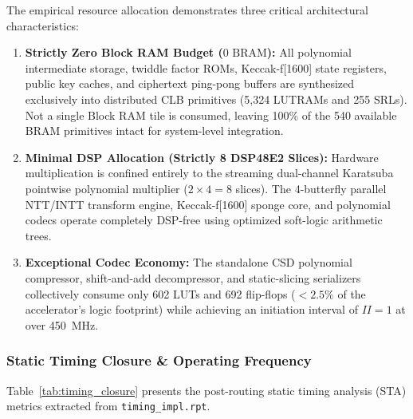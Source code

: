 The empirical resource allocation demonstrates three critical architectural characteristics:
\begin{enumerate}
    \item \textbf{Strictly Zero Block RAM Budget ($0\text{ BRAM}$):} All polynomial intermediate storage, twiddle factor ROMs, Keccak-f[1600] state registers, public key caches, and ciphertext ping-pong buffers are synthesized exclusively into distributed CLB primitives (5,324 LUTRAMs and 255 SRLs). Not a single Block RAM tile is consumed, leaving 100\% of the 540 available BRAM primitives intact for system-level integration.
    \item \textbf{Minimal DSP Allocation (Strictly 8 DSP48E2 Slices):} Hardware multiplication is confined entirely to the streaming dual-channel Karatsuba pointwise polynomial multiplier ($2 \times 4 = 8$ slices). The 4-butterfly parallel NTT/INTT transform engine, Keccak-f[1600] sponge core, and polynomial codecs operate completely DSP-free using optimized soft-logic arithmetic trees.
    \item \textbf{Exceptional Codec Economy:} The standalone CSD polynomial compressor, shift-and-add decompressor, and static-slicing serializers collectively consume only 602 LUTs and 692 flip-flops ($<2.5\%$ of the accelerator's logic footprint) while achieving an initiation interval of $II = 1$ at over 450~MHz.
\end{enumerate}

\subsubsection{Static Timing Closure \& Operating Frequency}
Table~\ref{tab:timing_closure} presents the post-routing static timing analysis (STA) metrics extracted from \texttt{timing\_impl.rpt}.

